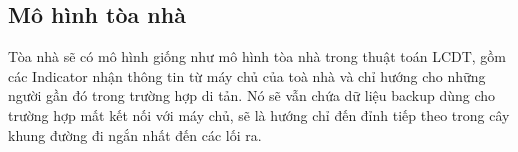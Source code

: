 \documentclass{article}
\begin{document}
    \subsection{Mô hình tòa nhà}
    Tòa nhà sẽ có mô hình giống như mô hình tòa nhà trong thuật toán 
    LCDT, gồm các Indicator nhận thông tin từ máy chủ của toà nhà 
    và chỉ hướng cho những người gần đó trong trường hợp di tản. Nó 
    sẽ vẫn chứa dữ liệu backup dùng cho trường hợp mất kết nối với máy 
    chủ, sẽ là hướng chỉ đến đỉnh tiếp theo trong cây khung đường đi 
    ngắn nhất đến các lối ra. 

    
\end{document}
